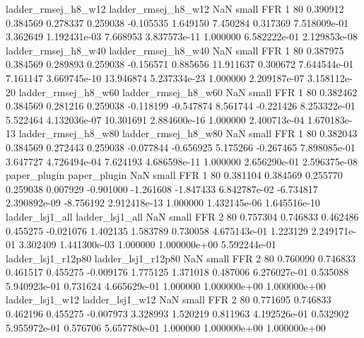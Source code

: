      ladder_rmsej_h8_w12      ladder_rmsej_h8_w12                   NaN      small      FFR                 1 80 0.390912       0.384569 0.278337       0.259038   -0.105535      1.649150      7.450284     0.317369   7.518009e-01  3.362649 1.192431e-03     7.668953   3.837573e-11            1.000000    6.582222e-01        2.129853e-08
     ladder_rmsej_h8_w40      ladder_rmsej_h8_w40                   NaN      small      FFR                 1 80 0.387975       0.384569 0.289893       0.259038   -0.156571      0.885656     11.911637     0.300672   7.644544e-01  7.161147 3.669745e-10    13.946874   5.237334e-23            1.000000    2.209187e-07        3.158112e-20
     ladder_rmsej_h8_w60      ladder_rmsej_h8_w60                   NaN      small      FFR                 1 80 0.382462       0.384569 0.281216       0.259038   -0.118199     -0.547874      8.561744    -0.221426   8.253322e-01  5.522464 4.132036e-07    10.301691   2.884600e-16            1.000000    2.400713e-04        1.670183e-13
     ladder_rmsej_h8_w80      ladder_rmsej_h8_w80                   NaN      small      FFR                 1 80 0.382043       0.384569 0.272443       0.259038   -0.077844     -0.656925      5.175266    -0.267465   7.898085e-01  3.647727 4.726494e-04     7.624193   4.686598e-11            1.000000    2.656290e-01        2.596375e-08
            paper_plugin             paper_plugin                   NaN      small      FFR                 1 80 0.381104       0.384569 0.255770       0.259038    0.007929     -0.901000     -1.261608    -1.847433   6.842787e-02 -6.734817 2.390892e-09    -8.756192   2.912418e-13            1.000000    1.432145e-06        1.645516e-10
         ladder_lsj1_all          ladder_lsj1_all                   NaN      small      FFR                 2 80 0.757304       0.746833 0.462486       0.455275   -0.021076      1.402135      1.583789     0.730058   4.675143e-01  1.223129 2.249171e-01     3.302409   1.441300e-03            1.000000    1.000000e+00        5.592244e-01
      ladder_lsj1_r12p80       ladder_lsj1_r12p80                   NaN      small      FFR                 2 80 0.760090       0.746833 0.461517       0.455275   -0.009176      1.775125      1.371018     0.487006   6.276027e-01  0.535088 5.940923e-01     0.731624   4.665629e-01            1.000000    1.000000e+00        1.000000e+00
         ladder_lsj1_w12          ladder_lsj1_w12                   NaN      small      FFR                 2 80 0.771695       0.746833 0.462196       0.455275   -0.007973      3.328993      1.520219     0.811963   4.192526e-01  0.532902 5.955972e-01     0.576706   5.657780e-01            1.000000    1.000000e+00        1.000000e+00
